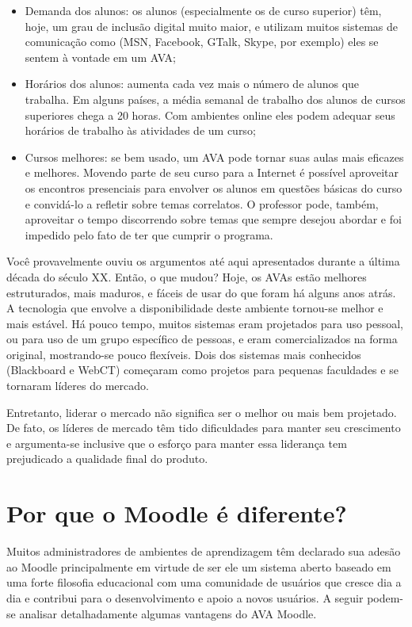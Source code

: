 \begin{itemize}
 \item Demanda dos alunos: os alunos (especialmente os de curso superior) têm, hoje, um grau de inclusão digital muito maior, e utilizam muitos sistemas de comunicação como (MSN, Facebook, GTalk, Skype, por exemplo) eles se sentem à vontade em um AVA;
 \item Horários dos alunos: aumenta cada vez mais o número de alunos que trabalha. Em alguns países, a média semanal de trabalho dos alunos de cursos superiores chega a 20 horas. Com ambientes online eles podem adequar seus horários de trabalho às atividades de um curso;
 \item Cursos melhores: se bem usado, um AVA pode tornar suas aulas mais eficazes e melhores. Movendo parte de seu curso para a Internet é possível aproveitar os encontros presenciais para envolver os alunos em questões básicas do curso e convidá-lo a refletir sobre temas correlatos. O professor pode, também, aproveitar o tempo discorrendo sobre temas que sempre desejou abordar e foi impedido pelo fato de ter que cumprir o programa.
\end{itemize}

Você provavelmente ouviu os argumentos até aqui apresentados durante a última década do século XX. Então, o que mudou? Hoje, os AVAs estão melhores estruturados, mais maduros, e fáceis de usar do que foram há alguns anos atrás. A tecnologia que envolve a disponibilidade deste ambiente tornou-se melhor e mais estável. Há pouco tempo, muitos sistemas eram projetados para uso pessoal, ou para uso de um grupo específico de pessoas, e eram comercializados na forma original, mostrando-se pouco flexíveis. Dois dos sistemas mais conhecidos (Blackboard e WebCT) começaram como projetos para pequenas faculdades e se tornaram líderes do mercado.

Entretanto, liderar o mercado não significa ser o melhor ou mais bem projetado. De fato, os líderes de mercado têm tido dificuldades para manter seu crescimento e argumenta-se inclusive que o esforço para manter essa liderança tem prejudicado a qualidade final do produto.



\section{Por que o Moodle é diferente?}

Muitos administradores de ambientes de aprendizagem têm declarado sua adesão ao Moodle principalmente em virtude de ser ele um sistema aberto baseado em uma forte filosofia educacional com uma comunidade de usuários que cresce dia a dia e contribui para o desenvolvimento e apoio a novos usuários. A seguir podem-se analisar detalhadamente algumas vantagens do AVA Moodle.

